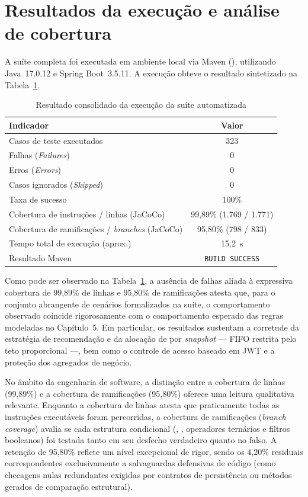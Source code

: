 \section{Resultados da execução e análise de cobertura}

A suíte completa foi executada em ambiente local via Maven (), utilizando Java~17.0.12 e Spring Boot~3.5.11. A execução obteve o resultado sintetizado na Tabela~\ref{tab:resultado-testes}.

\begin{table}[H]
  \centering
  \caption{Resultado consolidado da execução da suíte automatizada}
  \label{tab:resultado-testes}
  \begin{tabularx}{\textwidth}{X c}
    \toprule
    \textbf{Indicador} & \textbf{Valor} \\
    \midrule
    Casos de teste executados & 323 \\
    Falhas (\textit{Failures}) & 0 \\
    Erros (\textit{Errors}) & 0 \\
    Casos ignorados (\textit{Skipped}) & 0 \\
    Taxa de sucesso & 100\% \\
    Cobertura de instruções / linhas (JaCoCo) & 99,89\% (1.769 / 1.771) \\
    Cobertura de ramificações / \textit{branches} (JaCoCo) & 95,80\% (798 / 833) \\
    Tempo total de execução (aprox.) & 15,2~s \\
    Resultado Maven & \texttt{BUILD SUCCESS} \\
    \bottomrule
  \end{tabularx}
\end{table}

Como pode ser observado na Tabela~\ref{tab:resultado-testes}, a ausência de falhas aliada à expressiva cobertura de 99,89\% de linhas e 95,80\% de ramificações atesta que, para o conjunto abrangente de cenários formalizados na suíte, o comportamento observado coincide rigorosamente com o comportamento esperado das regras modeladas no Capítulo~5. Em particular, os resultados sustentam a corretude da estratégia de recomendação e da alocação de  por \textit{snapshot} --- FIFO restrita pelo teto proporcional ---, bem como o controle de acesso baseado em JWT e a proteção dos agregados de negócio.

No âmbito da engenharia de software, a distinção entre a cobertura de linhas (99,89\%) e a cobertura de ramificações (95,80\%) oferece uma leitura qualitativa relevante. Enquanto a cobertura de linhas atesta que praticamente todas as instruções executáveis foram percorridas, a cobertura de ramificações (\textit{branch coverage}) avalia se cada estrutura condicional (, , operadores ternários e filtros booleanos) foi testada tanto em seu desfecho verdadeiro quanto no falso. A retenção de 95,80\% reflete um nível excepcional de rigor, sendo os 4,20\% residuais correspondentes exclusivamente a salvaguardas defensivas de código (como checagens nulas redundantes exigidas por contratos de persistência ou métodos gerados de comparação estrutural).

